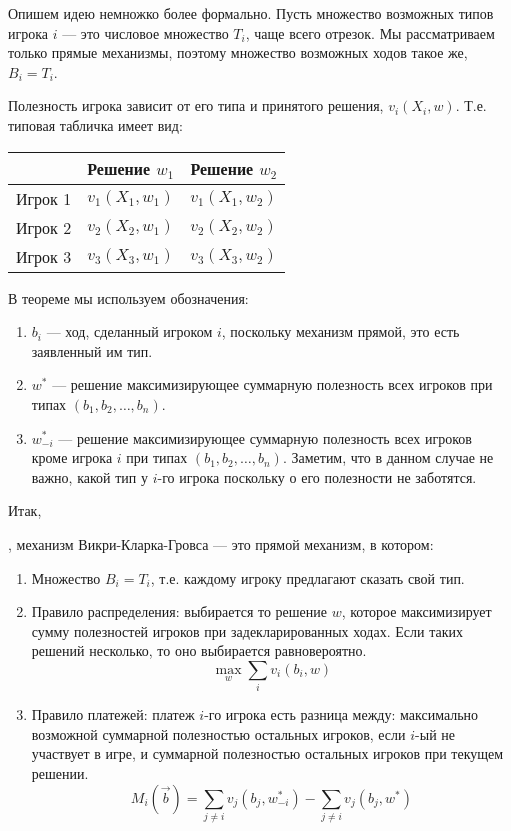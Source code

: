 Опишем идею немножко более формально. Пусть множество возможных типов игрока $ i $ --- это числовое множество $ T_{i} $, чаще всего отрезок. Мы рассматриваем только прямые механизмы, поэтому множество возможных ходов такое же, $ B_{i}=T_{i}$.

Полезность игрока зависит от его типа и принятого решения, $ v_{i}(X_{i},w) $. Т.е. типовая табличка имеет вид:

\begin{tabular}{c|cc}
& Решение $ w_{1} $ & Решение $ w_{2} $ \\ 
\hline 
Игрок 1 & $v_{1}(X_{1},w_{1})$ & $v_{1}(X_{1},w_{2})$ \\ 
Игрок 2 & $v_{2}(X_{2},w_{1})$ & $v_{2}(X_{2},w_{2})$ \\ 
Игрок 3 & $v_{3}(X_{3},w_{1})$ & $v_{3}(X_{3},w_{2})$ \\ 
\end{tabular} 


В теореме мы используем обозначения:

\begin{enumerate}
\item $b_{i}$ --- ход, сделанный игроком $ i $, поскольку механизм прямой, это есть заявленный им тип.
\item $w^{*}$ --- решение максимизирующее суммарную полезность всех игроков при типах $ (b_{1},b_{2},\ldots,b_{n}) $.
\item $w_{-i}^{*} $ --- решение максимизирующее суммарную полезность всех игроков кроме игрока $ i $ при типах $ (b_{1},b_{2},\ldots,b_{n}) $. Заметим, что в данном случае не важно, какой тип у $ i $-го игрока поскольку о его полезности не заботятся.
\end{enumerate}

Итак, 
\begin{mydef} , механизм Викри-Кларка-Гровса --- это прямой механизм, в котором:
\begin{enumerate}
\item Множество $ B_{i}=T_{i} $, т.е. каждому игроку предлагают сказать свой тип. 
\item Правило распределения: выбирается то решение $ w $, которое максимизирует сумму полезностей игроков при задекларированных ходах. Если таких решений несколько, то оно выбирается равновероятно.
\begin{equation}
\max_{w} \sum_{i} v_{i}(b_{i},w) 
\end{equation}
\item Правило платежей: платеж $ i $-го игрока есть разница между: максимально возможной суммарной полезностью остальных игроков, если $ i $-ый не участвует в игре, и суммарной полезностью остальных игроков при текущем решении. 
\begin{equation}
M_{i}(\vec{b})=\sum_{j\neq i} v_{j}(b_{j},w_{-i}^{*})-\sum_{j\neq i} v_{j}(b_{j},w^{*})
\end{equation}
\end{enumerate} 
\end{mydef}

